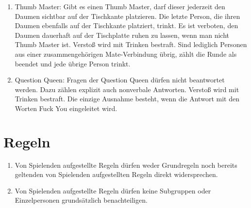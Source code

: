 \begin{enumerate}[label={(\arabic*)}]
	\item
	Thumb Master: Gibt es einen Thumb Master, darf dieser jederzeit den Daumen sichtbar auf der Tischkante platzieren.
	Die letzte Person, die ihren Daumen ebenfalls auf der Tischkante platziert, trinkt.
	Es ist verboten, den Daumen dauerhaft auf der Tischplatte ruhen zu lassen, wenn man nicht Thumb Master ist.
	Verstoß wird mit Trinken bestraft.
	Sind lediglich Personen aus einer zusammengehörigen Mate-Verbindung übrig, zählt die Runde als beendet und jede übrige Person trinkt.
	
	\item
	Question Queen: Fragen der Question Queen dürfen nicht beantwortet werden.
	Dazu zählen explizit auch nonverbale Antworten. Verstoß wird mit Trinken bestraft.
	Die einzige Ausnahme besteht, wenn die Antwort mit den Worten \glqq{} Fuck You\grqq{} eingeleitet wird.
\end{enumerate}

\section{Regeln}
\begin{enumerate}[label={(\arabic*)}]
	\item
	Von Spielenden aufgestellte Regeln dürfen weder Grundregeln noch bereits geltenden von Spielenden aufgestellten Regeln direkt widersprechen.
	
	\item
	Von Spielenden aufgestellte Regeln dürfen keine Subgruppen oder Einzelpersonen grundsätzlich benachteiligen.
\end{enumerate}

